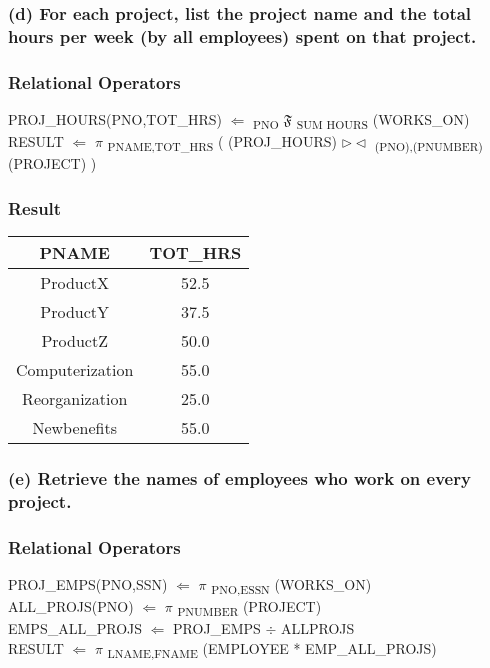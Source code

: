 \documentclass[11pt, oneside]{article}   	%
\begin{document}
\subsubsection*{(d) For each project, list the project name and the total hours per week (by all employees) spent on that project.}
\subsubsection*{Relational Operators}
PROJ\_HOURS(PNO,TOT\_HRS) $\Leftarrow$ \textsubscript{PNO} $\mathfrak{F}$ \textsubscript{SUM HOURS} (WORKS\_ON) \\
RESULT $\Leftarrow$ $\pi$ \textsubscript{PNAME,TOT\_HRS} ( (PROJ\_HOURS) $\rhd\lhd$ \textsubscript{(PNO),(PNUMBER)} (PROJECT) )

\subsubsection*{Result}  
\begin{center}
\begin{tabular}{ c | c }
  PNAME & TOT\_HRS  \\ \hline
  ProductX & 52.5 \\
  ProductY & 37.5 \\
  ProductZ & 50.0 \\
  Computerization & 55.0 \\
  Reorganization & 25.0 \\
  Newbenefits & 55.0 \\
\end{tabular}
\end{center}

\subsubsection*{(e) Retrieve the names of employees who work on every project.}
\subsubsection*{Relational Operators}
PROJ\_EMPS(PNO,SSN) $\Leftarrow$ $\pi$ \textsubscript{PNO,ESSN} (WORKS\_ON) \\
ALL\_PROJS(PNO) $\Leftarrow$ $\pi$ \textsubscript{PNUMBER} (PROJECT) \\
EMPS\_ALL\_PROJS $\Leftarrow$ PROJ\_EMPS $\div$ ALLPROJS \\
RESULT $\Leftarrow$ $\pi$ \textsubscript{LNAME,FNAME} (EMPLOYEE * EMP\_ALL\_PROJS)
\end{document}
